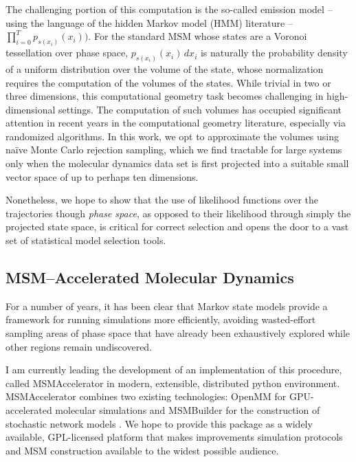 \documentclass[twocolumn,floatfix,nofootinbib,aps]{revtex4-1}
\begin{document}
The challenging portion of this computation is the so-called emission model -- using the language of the hidden Markov model (HMM) literature\cite{Rabiner1986Introduction} -- $\prod_{i=0}^{T} p_{s(x_i)}(x_{i}))$. For the standard MSM whose states are a Voronoi tessellation over phase space, $p_{s(x_i)}(x_i) \, dx_i$ is naturally the probability density of a uniform distribution over the volume of the state, whose normalization requires the computation of the volumes of the states. While trivial in two or three dimensions, this computational geometry task becomes challenging in high-dimensional settings. The computation of such volumes has occupied significant attention in recent years in the computational geometry literature, especially via randomized algorithms\cite{Kannan97, Simonovits03, Lovasz03}. In this work, we opt to approximate the volumes using na\"{i}ve Monte Carlo rejection sampling, which we find tractable for large systems only when the molecular dynamics data set is first projected into a suitable small vector space of up to perhaps ten dimensions.

Nonetheless, we hope to show that the use of likelihood functions over the trajectories though \emph{phase space}, as opposed to their likelihood through simply the projected state space, is critical for correct selection and opens the door to a vast set of statistical model selection tools.

\subsection{MSM--Accelerated Molecular Dynamics}
For a number of years, it has been clear that Markov state models provide a framework for running simulations more efficiently, avoiding wasted-effort sampling areas of phase space that have already been exhaustively explored while other regions remain undiscovered\cite{Bowman2010Enhanced, Weber2011Characterization}.

I am currently leading the development of an implementation of this procedure, called MSMAccelerator in modern, extensible, distributed python environment. MSMAccelerator combines two existing technologies: OpenMM for GPU-accelerated molecular simulations\cite{Eastman2013OpenMM} and MSMBuilder for the construction of stochastic network models \cite{Beauchamp:2011he}. We hope to provide this package as a widely available, GPL-licensed platform that makes improvements simulation protocols and MSM construction available to the widest possible audience.
\end{document}
